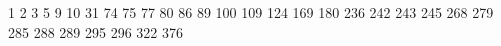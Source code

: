 1
2
3
5
9
10
31
74
75
77
80
86
89
100
109
124
169
180
236
242
243
245
268
279
285
288
289
295
296
322
376


